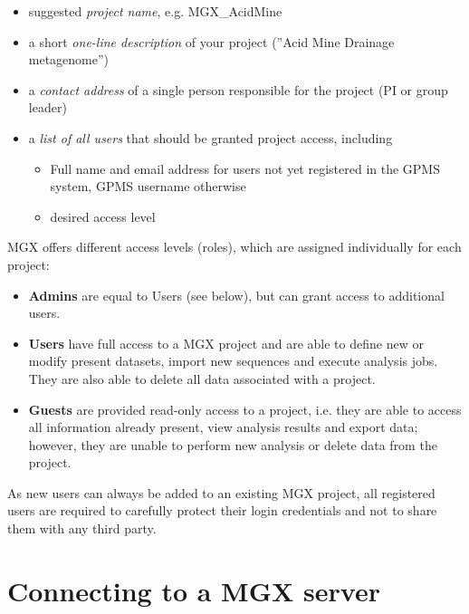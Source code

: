 \begin{itemize}
  \item suggested \textit{project name}, e.g. MGX\_AcidMine
  \item a short \textit{one-line description} of your project (''Acid Mine Drainage metagenome'')
  \item a \textit{contact address} of a single person responsible for the project (PI or group leader)
  \item a \textit{list of all users} that should be granted project access, including
    \begin{itemize}
      \item Full name and email address for users not yet registered in the GPMS system, GPMS username otherwise
      \item desired access level
    \end{itemize}
\end{itemize}

MGX offers different access levels (roles), which are assigned individually for each
project: \\

\begin{itemize}
  \item{\textbf{Admins} are equal to Users (see below), but can grant access to additional users.}
  \item \textbf{Users} have full access to a MGX project and are able to define new or modify
present datasets, import new sequences and execute analysis jobs. They are also able to
delete all data associated with a project.
  \item \textbf{Guests} are provided read-only access to a project, i.e. they are able to access
all information already present, view analysis results and export data; however, they are
unable to perform new analysis or delete data from the project.
\end{itemize}

As new users can always be added to an existing MGX project, all registered users are required
to carefully protect their login credentials and not to share them with any third party.

\section{Connecting to a MGX server}

